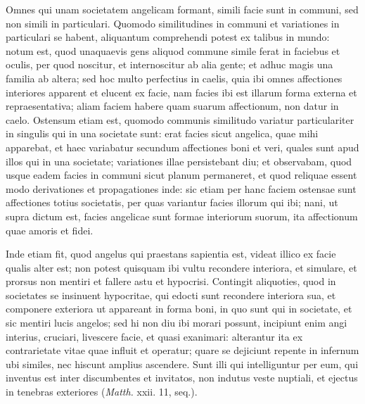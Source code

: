 \begin{topic}{47}
    Omnes qui unam societatem angelicam formant, simili facie sunt in communi, sed non simili in particulari.
    Quomodo similitudines in communi et variationes in particulari se habent, aliquantum comprehendi potest ex talibus
    in mundo: notum est, quod unaquaevis gens aliquod commune simile ferat in faciebus et oculis, per quod noscitur, et
    internoscitur ab alia gente; et adhuc magis una familia ab altera; sed hoc multo perfectius in caelis, quia ibi
    omnes affectiones interiores apparent et elucent ex facie, nam facies ibi est illarum forma externa et
    repraesentativa; aliam faciem habere quam suarum affectionum, non datur in caelo.
    Ostensum etiam est, quomodo communis similitudo variatur particulariter in singulis qui in una societate sunt: erat
    facies sicut angelica, quae mihi apparebat, et haec variabatur secundum affectiones boni et veri, quales sunt apud
    illos qui in una societate; variationes illae persistebant diu; et observabam, quod usque eadem facies in communi
    sicut planum permaneret, et quod reliquae essent modo derivationes et propagationes inde: sic etiam per hanc faciem
    ostensae sunt affectiones totius societatis, per quas variantur facies illorum qui ibi; nani, ut supra dictum est,
    facies angelicae sunt formae interiorum suorum, ita affectionum quae amoris et fidei.
\end{topic}

\begin{topic}{48}
    Inde etiam fit, quod angelus qui praestans sapientia est, videat illico ex facie qualis alter est; non potest
    quisquam ibi vultu recondere interiora, et simulare, et prorsus non mentiri et fallere astu et hypocrisi.
    Contingit aliquoties, quod in societates se insinuent hypocritae, qui edocti sunt recondere interiora sua, et
    componere exteriora ut appareant in forma boni, in quo sunt qui in societate, et sic mentiri lucis angelos; sed hi
    non diu ibi morari possunt, incipiunt enim angi interius, cruciari, livescere facie, et quasi exanimari: alterantur
    ita ex contrarietate vitae quae influit et operatur; quare se dejiciunt repente in infernum ubi similes, nec hiscunt
    amplius ascendere.
    Sunt illi qui intelliguntur per eum, qui inventus est inter discumbentes et invitatos, non indutus veste nuptiali,
    et ejectus in tenebras exteriores (\emph{Matth.} xxii. 11, seq.).
\end{topic}

